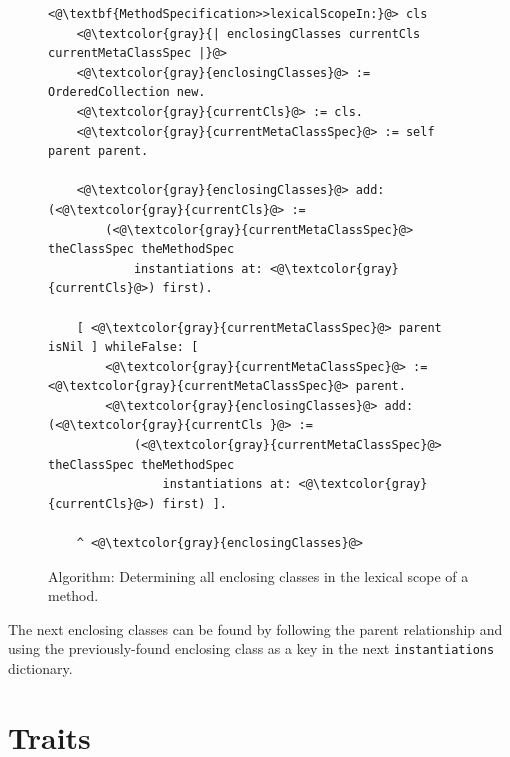 \begin{figure}[!htp]
\begin{lstlisting}
<@\textbf{MethodSpecification>>lexicalScopeIn:}@> cls
    <@\textcolor{gray}{| enclosingClasses currentCls currentMetaClassSpec |}@>
    <@\textcolor{gray}{enclosingClasses}@> := OrderedCollection new.
    <@\textcolor{gray}{currentCls}@> := cls.
    <@\textcolor{gray}{currentMetaClassSpec}@> := self parent parent.

    <@\textcolor{gray}{enclosingClasses}@> add: (<@\textcolor{gray}{currentCls}@> := 
        (<@\textcolor{gray}{currentMetaClassSpec}@> theClassSpec theMethodSpec 
            instantiations at: <@\textcolor{gray}{currentCls}@>) first).

    [ <@\textcolor{gray}{currentMetaClassSpec}@> parent isNil ] whileFalse: [
        <@\textcolor{gray}{currentMetaClassSpec}@> := <@\textcolor{gray}{currentMetaClassSpec}@> parent.
        <@\textcolor{gray}{enclosingClasses}@> add: (<@\textcolor{gray}{currentCls }@> := 
            (<@\textcolor{gray}{currentMetaClassSpec}@> theClassSpec theMethodSpec 
                instantiations at: <@\textcolor{gray}{currentCls}@>) first) ].

    ^ <@\textcolor{gray}{enclosingClasses}@>
\end{lstlisting}
\caption[Algorithm: Determining the lexical scope of a method]{Algorithm: Determining all enclosing classes in the lexical scope of a method.}
\label{fig:app_det_lex_scope_algo}
\end{figure}

The next enclosing classes can be found by following the parent relationship and using the previously-found enclosing class as a key in the next \texttt{instantiations} dictionary.

\section{Traits}
\label{sec:app_traits}

